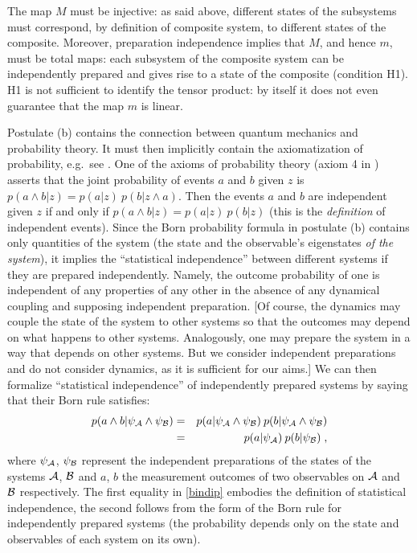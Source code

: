 \documentclass[aps,prl,amsmath,amssymb,twocolumn,nofootinbib]{revtex4}
\theoremstyle{plain}
\theoremstyle{definition}
\theoremstyle{remark}
\def\labell#1{\label{#1}}
\begin{document}
	The map $M$ must be injective: as said above, different states of the
	subsystems must correspond, by definition of composite system, to
	different states of the composite. Moreover, preparation independence
	implies that $M$, and hence $m$, must be total maps: each subsystem of
	the composite system can be independently prepared and gives rise to a
	state of the composite (condition H1).  H1 is not sufficient
	to identify the tensor product: by itself it does not even guarantee
	that the map $m$ is linear.
	
	Postulate (b) contains the connection between quantum mechanics
	and probability theory. It must then implicitly contain the
	axiomatization of probability, e.g.~see
	\cite{ballentinepaper,ballentinebook,cox}. One of the axioms of
	probability theory (axiom 4 in \cite{ballentinepaper}) asserts that
	the joint probability of events $a$ and $b$ given $z$ is
	$p(a\wedge b|z)=p(a|z)\:p(b|z\wedge a)$. Then the events $a$ and $b$ are
	independent given $z$ if and only if $p(a\wedge b|z)=p(a|z)\:p(b|z)$ (this
	is the {\em definition} of independent events). Since the Born
	probability formula in postulate (b) contains only quantities of the
	system (the state and the observable's eigenstates {\em of the
		system}), it implies the ``statistical independence'' between
	different systems if they are prepared independently. Namely, the
	outcome probability of one is independent of any properties of any
	other in the absence of any dynamical coupling and supposing
	independent preparation. [Of course, the dynamics may couple the state
	of the system to other systems so that the outcomes may depend on what
	happens to other systems.  Analogously, one may prepare the system in
	a way that depends on other systems. But we consider independent
	preparations and do not consider dynamics, as it is sufficient for our
	aims.] We can then formalize ``statistical independence'' of
	independently prepared systems by saying that their Born rule
	satisfies:
	\begin{eqnarray}
	p(a\wedge b|\psi_{\cal A}\wedge \psi_{\cal B})&=&p(a|\psi_{\cal A}\wedge \psi_{\cal
		B})\:p(b|\psi_{\cal A}\wedge \psi_{\cal B})\nonumber\\&=& p(a|\psi_{\cal
		A})\:p(b|\psi_{\cal B})
	\labell{bindip}\;,
	\end{eqnarray}
	where $\psi_{\cal A}$, $\psi_{\cal B}$ represent the independent
	preparations of the states of the systems $\cal A$, $\cal B$ and $a$,
	$b$ the measurement outcomes of two observables on $\cal A$ and $\cal
	B$ respectively. The first equality in \eqref{bindip} embodies the
	definition of statistical independence, the second follows from the
	form of the Born rule for independently prepared systems (the
	probability depends only on the state and observables of each system
	on its own).
	
\end{document}
